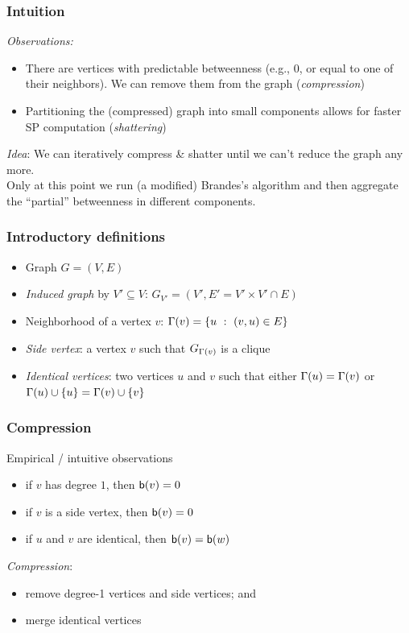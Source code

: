 \begin{frame}
  \frametitle{Intuition}
  \emph{Observations:}
  \begin{itemize}
    \item There are vertices with predictable betweenness (e.g., 0, or equal to one
      of their neighbors). We can remove them from the graph (\emph{compression})
    \item Partitioning the (compressed) graph into small components allows for
      faster SP computation (\emph{shattering})
  \end{itemize}
  \pause
  \emph{Idea}:
  We can iteratively compress \& shatter until we can't reduce the graph any
  more.\\
  \qquad Only at this point we run (a modified) Brandes's algorithm and then
  aggregate the ``partial'' betweenness in different components.
\end{frame}

\begin{frame}
  \frametitle{Introductory definitions}
  \vfill
  \begin{itemize}
    \item Graph $G=(V,E)$
    \item \emph{Induced graph} by $V'\subseteq V$: $G_{V'}=(V', E'=V'\times V'\cap E)$
    \pause
    \item Neighborhood of a vertex $v$: $\Gamma(v)=\{u~:~(v,u)\in E\}$
    \pause
  \item \emph{Side vertex}: a vertex $v$ such that $G_{\Gamma(v)}$ is a clique
    \pause
  \item \emph{Identical vertices}: two vertices $u$ and $v$ such that either
      $\Gamma(u)=\Gamma(v)$ or
      $\Gamma(u)\cup\{u\}=\Gamma(v)\cup\{v\}$
  \end{itemize}
  \vfill
\end{frame}


\begin{frame}
  \frametitle{Compression}
  \vfill
  Empirical / intuitive observations
  \begin{itemize}
    \item if $v$ has degree $1$, then $\mathsf{b}(v)=0$
    \item if $v$ is a side vertex, then $\mathsf{b}(v)=0$
    \item if $u$ and $v$ are identical, then $\mathsf{b}(v)=\mathsf{b}(w)$
  \end{itemize}
  \pause
  \vfill
  \emph{Compression}:
  \begin{itemize}
    \item remove degree-1 vertices and side vertices; and
    \item merge identical vertices
  \end{itemize}
  \vfill
\end{frame}

